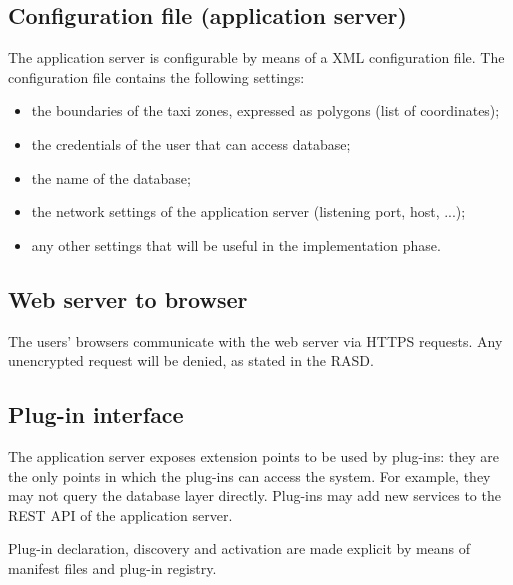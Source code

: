 \subsection{Configuration file (application server)}
The application server is configurable by means of a XML configuration file.
The configuration file contains the following settings:
\begin{itemize}
    \item the boundaries of the taxi zones, expressed as polygons (list of coordinates);
    \item the credentials of the user that can access database;
    \item the name of the database;
    \item the network settings of the application server (listening port, host, ...);
    \item any other settings that will be useful in the implementation phase.
\end{itemize}

\subsection{Web server to browser}
The users' browsers communicate with the web server via HTTPS requests. Any unencrypted request will be denied, as stated in the RASD.

\subsection{Plug-in interface}
The application server exposes extension points to be used by plug-ins: they are the only points in which the plug-ins can access the system. For example, they may not query the database layer directly.
Plug-ins may add new services to the REST API of the application server.

Plug-in declaration, discovery and activation are made explicit by means of manifest files and plug-in registry.
